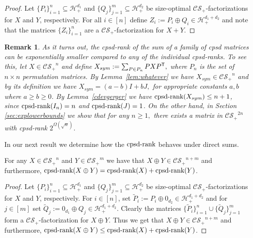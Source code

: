 \documentclass{siamart}
\newtheorem{remark}{Remark}[section]
\begin{document}
{{{\begin{proof}Let $\{P_i\}_{i=1}^n\subseteq {\mathcal{H}}^{d_1}_+$ and $\{Q_j\}_{j=1}^m\subseteq {\mathcal{H}}^{d_2}_+$ be size-optimal ${\mathcal{CS}_+}$-factorizations for $X$ and $Y$, respectively.  For all $i\in [n]$ define $Z_i:=P_i\oplus Q_i\in {\mathcal{H}}^{d_1+d_2}_+$ and note that the matrices  $\{Z_i\}_{i=1}^n$ are a ${\mathcal{CS}_+}$-factorization for $X+Y$.
\end{proof}
\medskip 

\begin{remark}As it turns out, the cpsd-rank of the sum of a family {of} cpsd matrices can be exponentially smaller compared to {any} of the individual cpsd-ranks. To see this, let
{$X\in {\mathcal{CS}_+}^n$} and define  $X_{sym}:=\sum_{P\in P_n}PXP^{{\sf T}},$  where  $P_n$ is the set of $n\times n$ permutation matrices. By Lemma~\ref{lem:whatever} we have   $X_{sym}\in {\mathcal{CS}_+}^n$ and  by its definition {we have} $X_{sym}=(a-b)I+bJ,$  for appropriate constants  $a,b$ where $a\ge b\ge 0$. By Lemma~\ref{cdevgerger} we have  ${\mathrm{cpsd}\textnormal{-rank}}(X_{sym})\le n+1$, {since ${\mathrm{cpsd}\textnormal{-rank}}(I_n) = n$ and ${\mathrm{cpsd}\textnormal{-rank}}(J) = 1$}. On the other hand, in Section \ref{sec:explowerbounds} we show that  for any $n\ge1,$ there exists a matrix in ${\mathcal{CS}_+}^{2n}$ with  cpsd-rank  $2^{\Omega(\sqrt{n})}$.
\end{remark}
\medskip 

In our next result  we determine how the  ${\mathrm{cpsd}\textnormal{-rank}}$ behaves under direct sums.

\medskip 

\begin{lemma}For any $X\in {\mathcal{CS}_+}^n$ and $Y\in  {\mathcal{CS}_+}^m$ we have that $X\oplus Y\in {\mathcal{CS}_+}^{n+m}$ and furthermore,  ${\mathrm{cpsd}\textnormal{-rank}}(X\oplus Y)={\mathrm{cpsd}\textnormal{-rank}}(X)+{\mathrm{cpsd}\textnormal{-rank}}(Y)$.
\end{lemma}
\medskip

\begin{proof}Let $\{P_i\}_{i=1}^n\subseteq {\mathcal{H}}^{d_1}_+$ and $\{Q_j\}_{j=1}^m\subseteq {\mathcal{H}}^{d_2}_+$ be size-optimal ${\mathcal{CS}_+}$-factorizations for $X$ and $Y$, respectively. For $i\in [n]$, set $\tilde{P}_i:= {P_i\oplus 0_{d_2}} \in {\mathcal{H}}^{d_1+d_2}_+$  and for $j\in [m]$ set $\tilde{Q}_j:= {0_{d_1}\oplus Q_j} \in {\mathcal{H}}^{d_1+d_2}_+$. Clearly the matrices $\{\tilde{P}_i\}_{i=1}^n\cup \{\tilde{Q}
_j\}_{j=1}^m$ form a ${\mathcal{CS}_+}$-factorization for $X\oplus Y$. Thus we get  that  $X\oplus Y\in {\mathcal{CS}_+}^{n+m}$ and  furthermore, ${\mathrm{cpsd}\textnormal{-rank}}(X\oplus Y)\le {\mathrm{cpsd}\textnormal{-rank}}(X)+{\mathrm{cpsd}\textnormal{-rank}}(Y)$.


\end{proof}}}}
\end{document}
